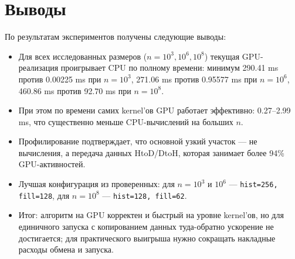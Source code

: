\documentclass[a4paper,14pt]{extarticle}
\begin{document}
\section*{Выводы}
По результатам экспериментов получены следующие выводы:
\begin{itemize}
    \item Для всех исследованных размеров (\(n=10^3, 10^6, 10^8\))
    текущая GPU-реализация проигрывает CPU по полному времени:
    минимум 290.41 ms против 0.00225 ms при \(n=10^3\),
    271.06 ms против 0.95577 ms при \(n=10^6\),
    460.86 ms против 92.70 ms при \(n=10^8\).
    \item При этом по времени самих kernel'ов GPU работает эффективно:
    0.27--2.99 ms, что существенно меньше CPU-вычислений на больших \(n\).
    \item Профилирование подтверждает, что основной узкий участок --- не вычисления,
    а передача данных HtoD/DtoH, которая занимает более 94\% GPU-активностей.
    \item Лучшая конфигурация из проверенных:
    для \(n=10^3\) и \(10^6\) --- \texttt{hist=256, fill=128},
    для \(n=10^8\) --- \texttt{hist=128, fill=62}.
    \item Итог: алгоритм на GPU корректен и быстрый на уровне kernel'ов, но для
    единичного запуска с копированием данных туда-обратно ускорение не достигается;
    для практического выигрыша нужно сокращать накладные расходы обмена и запуска.
\end{itemize}
\end{document}
